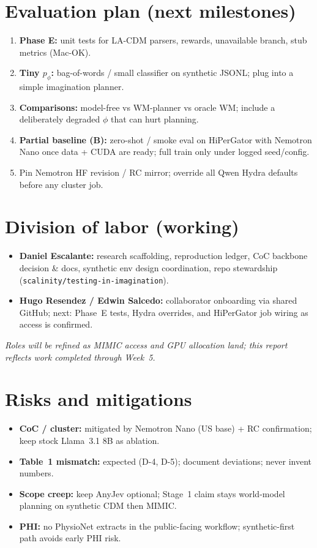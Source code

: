 \documentclass[11pt,letterpaper]{article}
\begin{document}
\section{Evaluation plan (next milestones)}

\begin{enumerate}
  \item \textbf{Phase E:} unit tests for LA-CDM parsers, rewards, unavailable branch, stub metrics (Mac-OK).
  \item \textbf{Tiny \(p_\phi\):} bag-of-words / small classifier on synthetic JSONL; plug into a simple imagination planner.
  \item \textbf{Comparisons:} model-free vs WM-planner vs oracle WM; include a deliberately degraded \(\phi\) that can hurt planning.
  \item \textbf{Partial baseline (B):} zero-shot / smoke eval on HiPerGator with Nemotron Nano once data + CUDA are ready; full train only under logged seed/config.
  \item Pin Nemotron HF revision / RC mirror; override all Qwen Hydra defaults before any cluster job.
\end{enumerate}

\section{Division of labor (working)}

\begin{itemize}
  \item \textbf{Daniel Escalante:} research scaffolding, reproduction ledger, CoC backbone decision \& docs, synthetic env design coordination, repo stewardship (\texttt{scalinity/testing-in-imagination}).
  \item \textbf{Hugo Resendez / Edwin Salcedo:} collaborator onboarding via shared GitHub; next: Phase~E tests, Hydra overrides, and HiPerGator job wiring as access is confirmed.
\end{itemize}
\noindent\textit{Roles will be refined as MIMIC access and GPU allocation land; this report reflects work completed through Week~5.}

\section{Risks and mitigations}

\begin{itemize}
  \item \textbf{CoC / cluster:} mitigated by Nemotron Nano (US base) + RC confirmation; keep stock Llama~3.1 8B as ablation.
  \item \textbf{Table~1 mismatch:} expected (D-4, D-5); document deviations; never invent numbers.
  \item \textbf{Scope creep:} keep AnyJev optional; Stage~1 claim stays world-model planning on synthetic CDM then MIMIC.
  \item \textbf{PHI:} no PhysioNet extracts in the public-facing workflow; synthetic-first path avoids early PHI risk.
\end{itemize}
\end{document}
